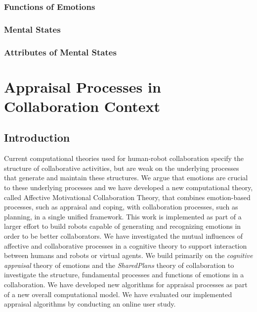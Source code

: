 \documentclass[12pt]{report}
\begin{document}
\subsection{Functions of Emotions}

\subsection{Mental States}

\subsection{Attributes of Mental States}

\chapter{Appraisal Processes in Collaboration Context}
\label{ch:appraisals}

\section{Introduction}
Current computational theories used for human-robot collaboration specify the
structure of collaborative activities, but are weak on the underlying processes
that generate and maintain these structures. We argue that emotions are crucial
to these underlying processes and we have developed a new computational theory,
called Affective Motivational Collaboration Theory, that combines emotion-based
processes, such as appraisal and coping, with collaboration processes, such as
planning, in a single unified framework. This work is implemented as part of a
larger effort to build robots capable of generating and recognizing emotions in
order to be better collaborators. We have investigated the mutual influences of
affective and collaborative processes in a cognitive theory to support
interaction between humans and robots or virtual agents. We build primarily on
the \textit{cognitive appraisal} theory of emotions and the \textit{SharedPlans}
theory of collaboration to investigate the structure, fundamental processes and
functions of emotions in a collaboration. We have developed new algorithms for
appraisal processes as part of a new overall computational model. We have
evaluated our implemented appraisal algorithms by conducting an online user
study.
\end{document}
